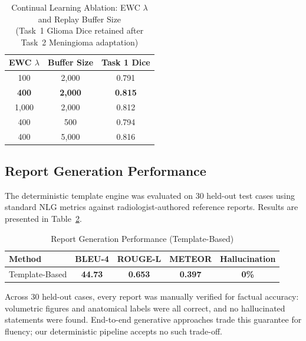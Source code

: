 \documentclass[conference]{IEEEtran}
\begin{document}
\begin{table}[htbp]
\caption{Continual Learning Ablation: EWC $\lambda$ and Replay Buffer Size\\(Task~1 Glioma Dice retained after Task~2 Meningioma adaptation)}
\begin{center}
\begin{tabular}{c c c}
\toprule
\textbf{EWC $\lambda$} & \textbf{Buffer Size} & \textbf{Task 1 Dice} \\
\midrule
100                   & 2{,}000  & 0.791 \\
\textbf{400}          & \textbf{2{,}000}  & \textbf{0.815} \\
1{,}000               & 2{,}000  & 0.812 \\
400                   & 500      & 0.794 \\
400                   & 5{,}000  & 0.816 \\
\bottomrule
\end{tabular}
\label{tab:cl_ablation}
\end{center}
\end{table}

\subsection{Report Generation Performance}
The deterministic template engine was evaluated on 30 held-out test cases using standard NLG metrics against radiologist-authored reference reports. Results are presented in Table~\ref{tab:report_results}.

\begin{table}[htbp]
\caption{Report Generation Performance (Template-Based)}
\begin{center}
\begin{tabular}{l c c c c}
\toprule
\textbf{Method} & \textbf{BLEU-4} & \textbf{ROUGE-L} & \textbf{METEOR} & \textbf{Hallucination} \\
\midrule
Template-Based & \textbf{44.73} & \textbf{0.653} & \textbf{0.397} & \textbf{0\%} \\
\bottomrule
\end{tabular}
\label{tab:report_results}
\end{center}
\end{table}

Across 30 held-out cases, every report was manually verified for factual accuracy: volumetric figures and anatomical labels were all correct, and no hallucinated statements were found. End-to-end generative approaches \cite{singhal2023medpalm,mansoor2025reasoning} trade this guarantee for fluency; our deterministic pipeline accepts no such trade-off.
\end{document}
